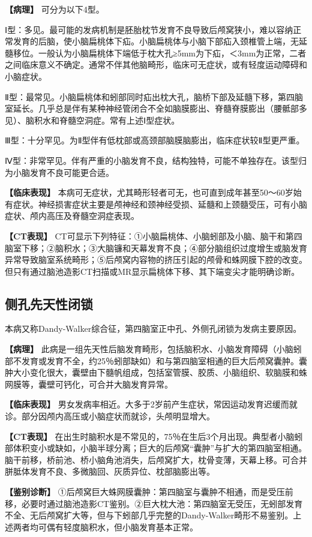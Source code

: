 \textbf{【病理】} 可分为以下4型。

Ⅰ型：多见。最可能的发病机制是胚胎枕节发育不良导致后颅窝狭小，难以容纳正常发育的后脑，使小脑扁桃体下疝。小脑扁桃体与小脑下部疝入颈椎管上端，无延髓移位。一般认为小脑扁桃体下端低于枕大孔≥5mm为下疝，＜3mm为正常，二者之间临床意义不确定。通常不伴其他脑畸形，临床可无症状，或有轻度运动障碍和小脑症状。

Ⅱ型：最常见。小脑扁桃体和蚓部同时疝出枕大孔，脑桥下部及延髓下移，第四脑室延长。几乎总是伴有某种神经管闭合不全如脑膜膨出、脊髓脊膜膨出（腰骶部多见）、脑积水和脊髓空洞症。常有上述Ⅰ型症状。

Ⅲ型：十分罕见。为Ⅱ型伴有低枕部或高颈部脑膜脑膨出，临床症状较Ⅱ型更严重。

Ⅳ型：非常罕见。伴有严重的小脑发育不良，结构独特，可能不单独存在。该型归为小脑发育不良可能更合适。

\textbf{【临床表现】}
本病可无症状，尤其畸形轻者可无，也可直到成年甚至50～60岁始有症状。神经损害症状主要是颅神经和颈神经受损、延髓和上颈髓受压，可有小脑症状、颅内高压及脊髓空洞症表现。

\textbf{【CT表现】}
CT可显示下列特征：①小脑扁桃体、小脑蚓部及小脑、脑干和第四脑室下移；②脑积水；③大脑镰和天幕发育不良；④部分脑组织过度增生或脑发育异常导致脑室系统畸形；⑤后颅窝内容物的挤压引起的颅骨和蛛网膜下腔的改变。但只有通过脑池造影CT扫描或MR显示扁桃体下移、其下端变尖才能明确诊断。

\subsection{侧孔先天性闭锁}

本病又称Dandy-Walker综合征，第四脑室正中孔、外侧孔闭锁为发病主要原因。

\textbf{【病理】}
此病是一组先天性后脑发育畸形，包括脑积水、小脑发育障碍（小脑蚓部不发育或发育不全，约25％蚓部缺如）和与第四脑室相通的巨大后颅窝囊肿。囊肿大小变化很大，囊壁由下髓帆组成，包括室管膜、胶质、小脑组织、软脑膜和蛛网膜等，囊壁可钙化，可合并大脑发育异常。

\textbf{【临床表现】}
男女发病率相近。大多于2岁前产生症状，常因运动发育迟缓而就诊。部分因颅内高压或小脑症状而就诊，头颅明显增大。

\textbf{【CT表现】}
在出生时脑积水是不常见的，75％在生后3个月出现。典型者小脑蚓部体积变小或缺如，小脑半球分离；巨大的后颅窝“囊肿”与扩大的第四脑室相通。脑干前移，桥前池、桥小脑角池消失，后颅窝扩大，枕骨变薄，天幕上移。可合并胼胝体发育不良、多微脑回、灰质异位、枕部脑膨出等。

\textbf{【鉴别诊断】}
①后颅窝巨大蛛网膜囊肿：第四脑室与囊肿不相通，而是受压前移，必要时通过脑池造影CT鉴别。②巨大枕大池：第四脑室无受压，无蚓部发育不全、无后颅窝扩大等，但与下蚓部几乎完整的Dandy-Walker畸形不易鉴别。上述两者均可偶有轻度脑积水，但小脑发育基本正常。

